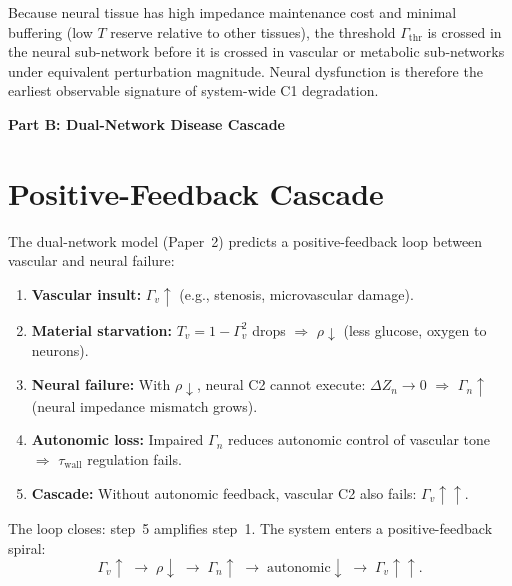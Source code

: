 \documentclass[aps,pre,twocolumn,superscriptaddress,floatfix]{revtex4-2}
\begin{document}
\begin{corollary}
\label{cor:neural-observability}
Because neural tissue has high impedance maintenance
cost and minimal buffering (low $T$ reserve relative to
other tissues), the threshold $\Gamma_{\mathrm{thr}}$ is
crossed in the neural sub-network before it is crossed
in vascular or metabolic sub-networks under equivalent
perturbation magnitude.
Neural dysfunction is therefore the earliest
observable signature of system-wide C1 degradation.
\end{corollary}


\bigskip\noindent\textbf{\large Part B: Dual-Network Disease Cascade}
\label{part:B}
\bigskip


\section{Positive-Feedback Cascade}
\label{sec:cascade}

The dual-network model (Paper~2) predicts a
positive-feedback loop between vascular and neural
failure:

\begin{enumerate}
  \item \textbf{Vascular insult:}
    $\Gamma_v\!\uparrow$ (e.g., stenosis,
    microvascular damage).
  \item \textbf{Material starvation:}
    $T_v = 1 - \Gamma_v^2$ drops $\Rightarrow$
    $\rho\!\downarrow$ (less glucose, oxygen to
    neurons).
  \item \textbf{Neural failure:}
    With $\rho\!\downarrow$, neural C2 cannot execute:
    $\Delta Z_n \to 0$ $\Rightarrow$
    $\Gamma_n\!\uparrow$ (neural impedance mismatch
    grows).
  \item \textbf{Autonomic loss:}
    Impaired $\Gamma_n$ reduces autonomic control of
    vascular tone $\Rightarrow$
    $\tau_{\text{wall}}$ regulation fails.
  \item \textbf{Cascade:}
    Without autonomic feedback, vascular C2 also fails:
    $\Gamma_v\!\uparrow\!\uparrow$.
\end{enumerate}

The loop closes: step~5 amplifies step~1.
The system enters a positive-feedback spiral:
\begin{equation}
  \Gamma_v\!\uparrow \;\to\; \rho\!\downarrow \;\to\;
  \Gamma_n\!\uparrow \;\to\;
  \text{autonomic}\!\downarrow \;\to\;
  \Gamma_v\!\uparrow\!\uparrow.
  \label{eq:cascade}
\end{equation}
\end{document}
